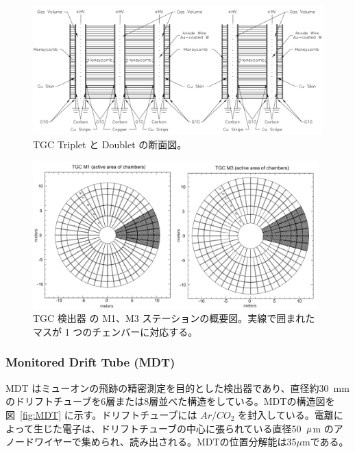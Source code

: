 \begin{figure}[tb]
  \centering
  \includegraphics[clip, width=13cm]{fig/2/TGC_construction.pdf}
  \caption{TGC Triplet と Doublet の断面図\cite{Aad:1129811}。}
  \label{fig:TGC}
\end{figure}

\begin{figure}[tb]
  \centering
  \includegraphics[clip, width=11cm]{fig/2/TGC_octant.png}
  \caption{TGC 検出器 の M1、M3 ステーションの概要図\cite{Lellouch:684103}。実線で囲まれたマスが 1 つのチェンバーに対応する。}
  \label{fig:TGC_oc}
\end{figure}

\subsubsection{Monitored Drift Tube (MDT)}
MDT はミューオンの飛跡の精密測定を目的とした検出器であり、直径約30~mmのドリフトチューブを6層または8層並べた構造をしている。MDTの構造図を図~\ref{fig:MDT} に示す。ドリフトチューブには $Ar/CO_2$ を封入している。電離によって生じた電子は、ドリフトチューブの中心に張られている直径50~$\rm{\mu}$m のアノードワイヤーで集められ、読み出される。MDTの位置分解能は35$\mu$mである。

